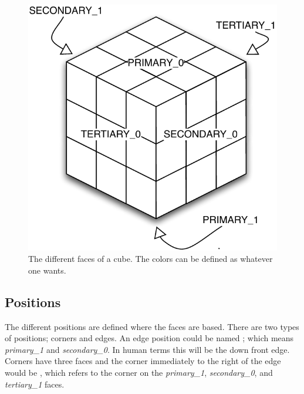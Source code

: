 \begin{figure}[htbp]
	\centering
		\includegraphics[scale=0.5]{input/pics/faceRanking.pdf}
	\caption{The different faces of a cube. The colors can be defined as whatever one wants.}
	\label{fig:faceRanking}
\end{figure}


\subsection{Positions}
The different positions are defined where the faces are based. There are two types of positions; corners and edges.
An edge position could be named ; which means \textit{primary\_1} and \textit{secondary\_0}.
In human terms this will be the down front edge.
Corners have three faces and the corner immediately to the right of the edge would be , which refers to the corner on the \textit{primary\_1}, \textit{secondary\_0}, and \textit{tertiary\_1} faces.

